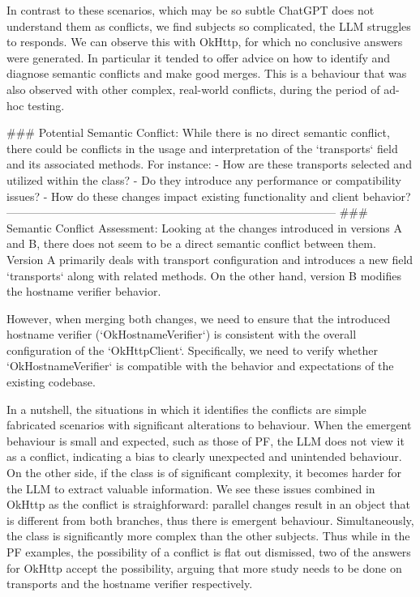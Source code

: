 In contrast to these scenarios, which may be so subtle ChatGPT does not understand them as conflicts, we find subjects so complicated, the LLM struggles to responds.
We can observe this with OkHttp, for which no conclusive answers were generated. In particular it tended to offer advice on how to identify and diagnose semantic conflicts and make good merges. This is a behaviour that was also observed with other complex, real-world conflicts, during the period of ad-hoc testing.
\begin{response}
### Potential Semantic Conflict:
While there is no direct semantic conflict, there could be conflicts in the usage and interpretation of the `transports` field and its associated methods. For instance:
- How are these transports selected and utilized within the class?
- Do they introduce any performance or compatibility issues?
- How do these changes impact existing functionality and client behavior?
---------------------------------------------------------------------------------------
### Semantic Conflict Assessment:
Looking at the changes introduced in versions A and B, there does not seem to be a direct semantic conflict between them. Version A primarily deals with transport configuration and introduces a new field `transports` along with related methods. On the other hand, version B modifies the hostname verifier behavior.

However, when merging both changes, we need to ensure that the introduced hostname verifier (`OkHostnameVerifier`) is consistent with the overall configuration of the `OkHttpClient`. Specifically, we need to verify whether `OkHostnameVerifier` is compatible with the behavior and expectations of the existing codebase.
\end{response}

In a nutshell, the situations in which it identifies the conflicts are simple fabricated scenarios with significant alterations to behaviour. When the emergent behaviour is small and expected, such as those of PF, the LLM does not view it as a conflict, indicating a bias to clearly unexpected and unintended behaviour. On the other side, if the class is of significant complexity, it becomes harder for the LLM to extract valuable information.
We see these issues combined in OkHttp as the conflict is straighforward: parallel changes result in an object that is different from both branches, thus there is emergent behaviour. Simultaneously, the class is significantly more complex than the other subjects. Thus while in the PF examples, the possibility of a conflict is flat out dismissed,
two of the answers for OkHttp accept the possibility, arguing that more study needs to be done on transports and the hostname verifier respectively.

